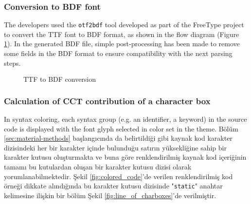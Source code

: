 \documentclass{article}
\begin{document}
\subsubsection{Conversion to BDF font}

The developers used the \texttt{otf2bdf} tool\cite{otf2bdf2008man} developed as part of the FreeType project\cite{freetype2022project} to convert the TTF font to BDF format, as shown in the flow diagram (Figure \ref{fig:otf2bdf}). In the generated BDF file, simple post-processing has been made to remove some fields in the BDF format to ensure compatibility with the next parsing steps.

\begin{figure}[H]
  \caption{TTF to BDF conversion}
  \label{fig:otf2bdf}

\end{figure}

\subsubsection{Calculation of CCT contribution of a character box}

In syntax coloring, each syntax group (e.g. an identifier, a keyword) in the source code is displayed with the font
glyph selected in color set in the theme. Bölüm \ref{sec:material-methods} başlangıcında da belirtildiği gibi kaynak kod
karakter dizisindeki her bir karakter içinde bulunduğu satırın yüksekliğine sahip bir karakter kutusu oluşturmakta ve
buna göre renklendirilmiş kaynak kod içeriğinin tamamı bu kutulardan oluşan bir karakter kutusu dizisi olarak
yorumlanabilmektedir. Şekil \ref{fig:colored_code}'de verilen renklendirilmiş kod örneği dikkate alındığında bu karakter
kutusu dizisinde "\texttt{static}" anahtar kelimesine ilişkin bir bölüm Şekil \ref{fig:line_of_charboxes}'de
verilmiştir.
\end{document}
